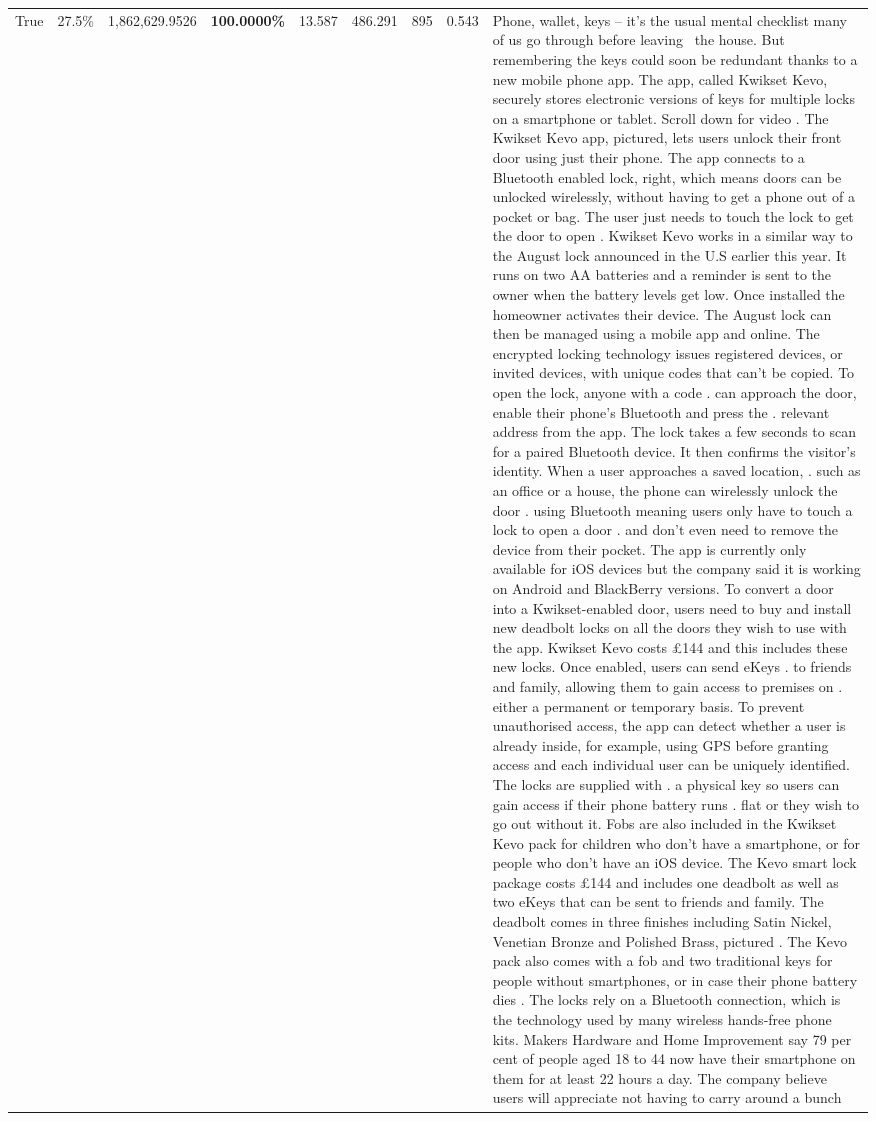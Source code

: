 \begin{table}[H]
\begin{tabular}{lllrlllll}
True & 27.5\% & 1,862,629.9526 & \bfseries \color{red} 100.0000\% & 13.587 & 486.291 & 895 & 0.543 & Phone, wallet, keys – it’s the usual mental checklist many of us go through before leaving  the house. But remembering the keys could soon be redundant thanks to a new mobile phone app. The app, called Kwikset Kevo, securely stores electronic versions of keys for multiple locks on a smartphone or tablet. Scroll down for video . The Kwikset Kevo app, pictured, lets users unlock their front door using just their phone. The app connects to a Bluetooth enabled lock, right, which means doors can be unlocked wirelessly, without having to get a phone out of a pocket or bag. The user just needs to touch the lock to get the door to open . Kwikset Kevo works in a similar way to the August lock announced in the U.S earlier this year. It runs on two AA batteries and a reminder is sent to the owner when the battery levels get low. Once installed the homeowner activates their device. The August lock can then be managed using a mobile app and online. The encrypted locking technology issues registered devices, or invited devices, with unique codes that can't be copied. To open the lock, anyone with a code . can approach the door, enable their phone's Bluetooth and press the . relevant address from the app. The lock takes a few seconds to scan for a paired Bluetooth device. It then confirms the visitor's identity. When a user approaches a saved location, . such as an office or a house, the phone can wirelessly unlock the door . using Bluetooth meaning users only have to touch a lock to open a door . and don't even need to remove the device from their pocket. The app is currently only available for iOS devices but the company said it is working on Android and BlackBerry versions. To convert a door into a Kwikset-enabled door, users need to buy and install new deadbolt locks on all the doors they wish to use with the app. Kwikset Kevo costs £144 and this includes these new locks. Once enabled, users can send eKeys . to friends and family, allowing them to gain access to premises on . either a permanent or temporary basis. To prevent unauthorised access, the app can detect whether a user is already inside, for example, using GPS before granting access and each individual user can be uniquely identified. The locks are supplied with . a physical key so users can gain access if their phone battery runs . flat or they wish to go out without it. Fobs are also included in the Kwikset Kevo pack for children who don't have a smartphone, or for people who don't have an iOS device. The Kevo smart lock package costs £144 and includes one deadbolt as well as two eKeys that can be sent to friends and family. The deadbolt comes in three finishes including Satin Nickel, Venetian Bronze and Polished Brass, pictured . The Kevo pack also comes with a fob and two traditional keys for people without smartphones, or in case their phone battery dies . The locks rely on a Bluetooth connection, which is the technology used by many wireless hands-free phone kits. Makers Hardware and Home Improvement say 79 per cent of people aged 18 to 44 now have their smartphone on them for at least 22 hours a day. The company believe users will appreciate not having to carry around a bunch 
\end{tabular}
\end{table}
